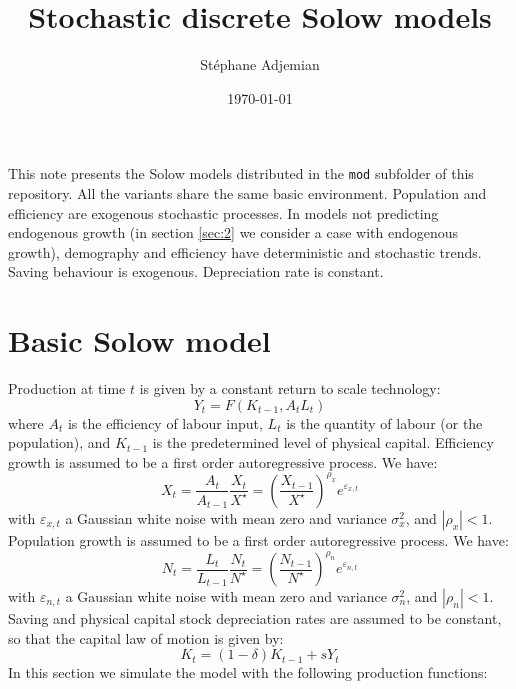\documentclass[twoside]{amsart}
\title{Stochastic discrete Solow models}
\author{St\'ephane Adjemian}
\date{\today}
\begin{document}
\maketitle

This note presents the Solow models distributed in the \verb+mod+ subfolder of this repository. All the variants share the same basic environment. Population and efficiency are exogenous stochastic processes. In models not predicting endogenous growth (in section \ref{sec:2} we consider a case with endogenous growth), demography and efficiency have deterministic and stochastic trends. Saving behaviour is exogenous. Depreciation rate is constant.

\section{Basic Solow model}
\label{sec:1}

Production at time $t$ is given by a constant return to scale technology:
\begin{equation}
  \label{eq:production}
  Y_t = F(K_{t-1}, A_t L_t)
\end{equation}
where $A_t$ is the efficiency of labour input, $L_t$ is the quantity of labour (or the population), and $K_{t-1}$ is the predetermined level of physical capital. Efficiency growth is assumed to be a first order autoregressive process. We have:
\begin{subequations}
  \label{eq:growingefficiency}
\begin{equation}
  \label{eq:efficiencygrowthfactor-1}
  X_t = \frac{A_t}{A_{t-1}}
\end{equation}
\begin{equation}
  \label{eq:efficiencygrowthfactor-2}
  \frac{X_t}{X^{\star}} = \left(\frac{X_{t-1}}{X^{\star}}\right)^{\rho_x}e^{\varepsilon_{x,t}}
\end{equation}
\end{subequations}
with $\varepsilon_{x,t}$ a Gaussian white noise with mean zero and variance $\sigma_x^2$, and $|\rho_x|<1$. Population growth is assumed to be a first order autoregressive process. We have:
\begin{subequations}
  \label{eq:growingpopulation}
\begin{equation}
  \label{eq:populationgrowthfactor-1}
  N_t = \frac{L_t}{L_{t-1}}
\end{equation}
\begin{equation}
  \label{eq:populationgrowthfactor-2}
  \frac{N_t}{N^{\star}} = \left(\frac{N_{t-1}}{N^{\star}}\right)^{\rho_n}e^{\varepsilon_{n,t}}
\end{equation}
\end{subequations}
with $\varepsilon_{n,t}$ a Gaussian white noise with mean zero and variance $\sigma_n^2$, and $|\rho_n|<1$. Saving and physical capital stock depreciation rates are assumed to be constant, so that the capital law of motion is given by:
\begin{equation}
  \label{eq:capitallawofmotion}
  K_t = (1-\delta)K_{t-1} + s Y_t
\end{equation}
In this section we simulate the model with the following production functions:\newline
\end{document}
